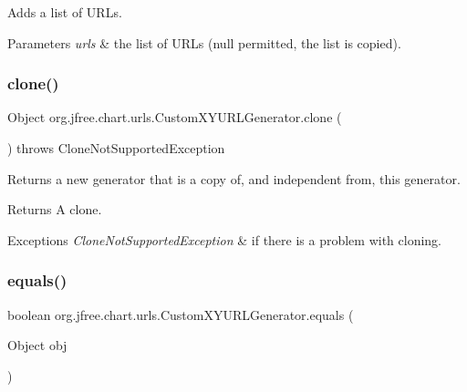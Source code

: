 Adds a list of U\+R\+Ls.


\begin{DoxyParams}{Parameters}
{\em urls} & the list of U\+R\+Ls ({\ttfamily null} permitted, the list is copied). \\
\hline
\end{DoxyParams}
\mbox{\label{classorg_1_1jfree_1_1chart_1_1urls_1_1_custom_x_y_u_r_l_generator_af8eb7d351fe6bd0534a2845ecc1fa5c7}} 
\subsubsection{\texorpdfstring{clone()}{clone()}}
{\footnotesize\ttfamily Object org.\+jfree.\+chart.\+urls.\+Custom\+X\+Y\+U\+R\+L\+Generator.\+clone (\begin{DoxyParamCaption}{ }\end{DoxyParamCaption}) throws Clone\+Not\+Supported\+Exception}

Returns a new generator that is a copy of, and independent from, this generator.

\begin{DoxyReturn}{Returns}
A clone.
\end{DoxyReturn}

\begin{DoxyExceptions}{Exceptions}
{\em Clone\+Not\+Supported\+Exception} & if there is a problem with cloning. \\
\hline
\end{DoxyExceptions}
\mbox{\label{classorg_1_1jfree_1_1chart_1_1urls_1_1_custom_x_y_u_r_l_generator_a0e8e556697e1a95db6f3a93cc31a8d53}} 
\subsubsection{\texorpdfstring{equals()}{equals()}}
{\footnotesize\ttfamily boolean org.\+jfree.\+chart.\+urls.\+Custom\+X\+Y\+U\+R\+L\+Generator.\+equals (\begin{DoxyParamCaption}\item[{Object}]{obj }\end{DoxyParamCaption})}


